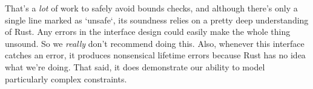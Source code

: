 That's a \emph{lot} of work to safely avoid bounds checks, and although there's
only a single line marked as `unsafe`, its soundness relies on a pretty deep
understanding of Rust. Any errors in the interface design could easily make
the whole thing unsound. So we \emph{really} don't recommend doing this. Also, whenever
this interface catches an error, it produces nonsensical lifetime errors because
Rust has no idea what we're doing. That said, it does demonstrate our ability to
model particularly complex constraints.
